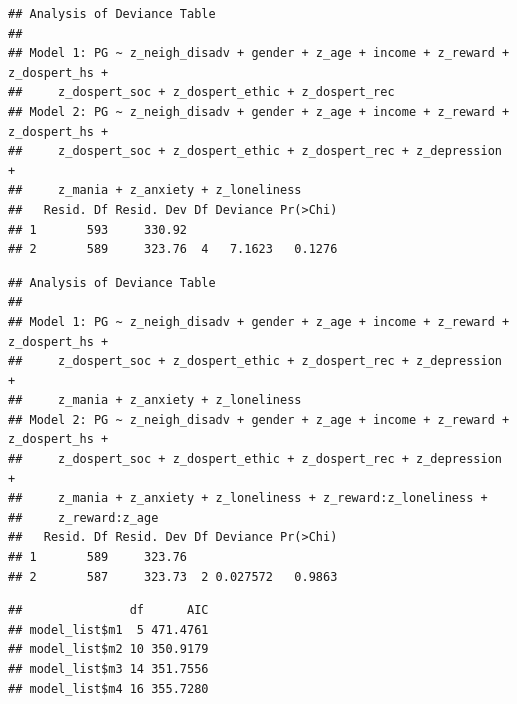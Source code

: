 \documentclass[
]{article}
\newenvironment{Shaded}{\begin{snugshade}}{\end{snugshade}}
\newcommand{\NormalTok}[1]{#1}
\newcommand{\SpecialCharTok}[1]{\textcolor[rgb]{0.81,0.36,0.00}{\textbf{#1}}}
\begin{document}
\begin{verbatim}
## Analysis of Deviance Table
## 
## Model 1: PG ~ z_neigh_disadv + gender + z_age + income + z_reward + z_dospert_hs + 
##     z_dospert_soc + z_dospert_ethic + z_dospert_rec
## Model 2: PG ~ z_neigh_disadv + gender + z_age + income + z_reward + z_dospert_hs + 
##     z_dospert_soc + z_dospert_ethic + z_dospert_rec + z_depression + 
##     z_mania + z_anxiety + z_loneliness
##   Resid. Df Resid. Dev Df Deviance Pr(>Chi)
## 1       593     330.92                     
## 2       589     323.76  4   7.1623   0.1276
\end{verbatim}

\begin{Shaded}
\end{Shaded}

\begin{verbatim}
## Analysis of Deviance Table
## 
## Model 1: PG ~ z_neigh_disadv + gender + z_age + income + z_reward + z_dospert_hs + 
##     z_dospert_soc + z_dospert_ethic + z_dospert_rec + z_depression + 
##     z_mania + z_anxiety + z_loneliness
## Model 2: PG ~ z_neigh_disadv + gender + z_age + income + z_reward + z_dospert_hs + 
##     z_dospert_soc + z_dospert_ethic + z_dospert_rec + z_depression + 
##     z_mania + z_anxiety + z_loneliness + z_reward:z_loneliness + 
##     z_reward:z_age
##   Resid. Df Resid. Dev Df Deviance Pr(>Chi)
## 1       589     323.76                     
## 2       587     323.73  2 0.027572   0.9863
\end{verbatim}

\begin{Shaded}
\end{Shaded}

\begin{verbatim}
##               df      AIC
## model_list$m1  5 471.4761
## model_list$m2 10 350.9179
## model_list$m3 14 351.7556
## model_list$m4 16 355.7280
\end{verbatim}

\begin{Shaded}
\end{Shaded}
\end{document}
